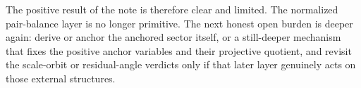 \documentclass[11pt]{article}
\begin{document}
The positive result of the note is therefore clear and limited. The normalized pair-balance layer is no longer primitive. The next honest open burden is deeper again: derive or anchor the anchored sector itself, or a still-deeper mechanism that fixes the positive anchor variables and their projective quotient, and revisit the scale-orbit or residual-angle verdicts only if that later layer genuinely acts on those external structures.
\end{document}
